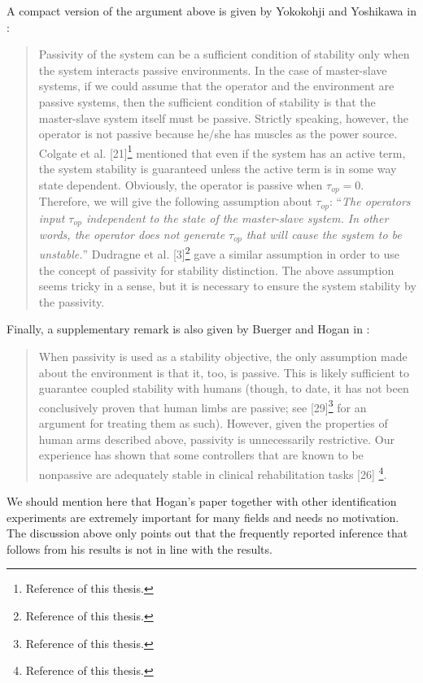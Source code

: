 A compact version of the argument above is given by Yokokohji and Yoshikawa in \cite{yokokohjiyoshikawa}: 
\begin{quote}
Passivity of the system can be a
sufficient condition of stability only when the system interacts
passive environments. In the case of master-slave systems, if
we could assume that the operator and the environment are
passive systems, then the sufficient condition of stability is
that the master-slave system itself must be passive. Strictly
speaking, however, the operator is not passive because he/she
has muscles as the power source. Colgate et al. [21]\footnote{Reference 
\cite{colgatehogan88} of this thesis.} mentioned
that even if the system has an active term, the system stability
is guaranteed unless the active term is in some way state dependent.
Obviously, the operator is passive when $\tau_{op}= 0$.
Therefore, we will give the following assumption about $\tau_{op}$:
\enquote{\emph{The operators input $\tau_{op}$ independent to the state of the
master-slave system. In other words, the operator does not
generate $\tau_{op}$ that will cause the system to be unstable.}}
Dudragne et al. [3]\footnote{Reference \cite{dudragne} of this thesis.} gave a similar assumption in order to use
the concept of passivity for stability distinction. The above
assumption seems tricky in a sense, but it is necessary to ensure
the system stability by the passivity.
\end{quote}

\noindent Finally, a supplementary remark is also given by Buerger and Hogan in \cite{buergerhogan1}: 
\begin{quote}
When passivity is used as a stability objective, the only assumption
made about the environment is that it, too, is passive.
This is likely sufficient to guarantee coupled stability with humans
(though, to date, it has not been conclusively proven that
human limbs are passive; see [29]\footnote{Reference \cite{hogan89} 
of this thesis.} for an argument for treating them as such). However, 
given the properties of human arms 
described above, passivity is unnecessarily restrictive. Our experience
has shown that some controllers that are known to be
nonpassive are adequately stable in clinical rehabilitation tasks [26]%
\footnote{Reference \cite{buergerconf} of this thesis.}.
\end{quote}


We should mention here that Hogan's paper together with other identification experiments are extremely important for many
fields and needs no motivation. The discussion above only points out that the frequently reported inference that follows from 
his results is not in line with the results. 


